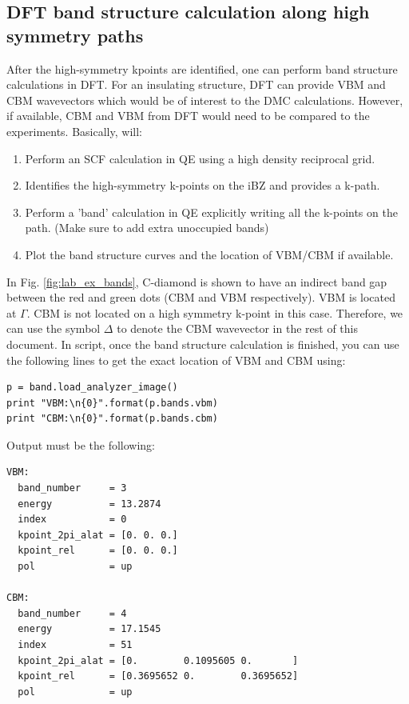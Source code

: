 \subsection{DFT band structure calculation along high symmetry paths}
After the high-symmetry kpoints are identified, one can perform band structure calculations in DFT. 
For an insulating structure, DFT can provide VBM and CBM wavevectors which would be of interest to the DMC calculations. 
However, if available, CBM and VBM from DFT would need to be compared to the experiments.  
Basically,   will:
\begin{enumerate}
	\item Perform an SCF calculation in QE using a high density reciprocal grid.
	\item Identifies the high-symmetry k-points on the iBZ and provides a k-path.
	\item Perform a 'band' calculation in QE explicitly writing all the k-points on the path. (Make sure to add extra unoccupied bands)
	\item Plot the band structure curves and the location of VBM/CBM if available.
\end{enumerate}
In Fig. \ref{fig:lab_ex_bands}, C-diamond is shown to have an indirect band gap between the red and green dots (CBM and VBM respectively). 
VBM is located at $\Gamma$. CBM is not located on a high symmetry k-point in this case. 
Therefore, we can use the symbol $\Delta$ to denote the CBM wavevector in the rest of this document. 
In  script, once the band structure calculation is finished, you can use the following lines to get the exact location of VBM and CBM using:
\begin{lstlisting}[style=Python]
p = band.load_analyzer_image()
print "VBM:\n{0}".format(p.bands.vbm)
print "CBM:\n{0}".format(p.bands.cbm)
\end{lstlisting}
Output must be the following:
\begin{lstlisting}[style=Python]
VBM:
  band_number     = 3
  energy          = 13.2874
  index           = 0
  kpoint_2pi_alat = [0. 0. 0.]
  kpoint_rel      = [0. 0. 0.]
  pol             = up

CBM:
  band_number     = 4
  energy          = 17.1545
  index           = 51
  kpoint_2pi_alat = [0.        0.1095605 0.       ]
  kpoint_rel      = [0.3695652 0.        0.3695652]
  pol             = up
\end{lstlisting}
